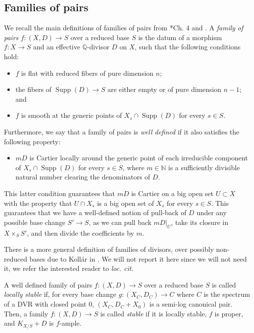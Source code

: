 \documentclass{amsart}
\theoremstyle{definition}
\DeclareMathOperator{\Supp}{Supp}
\newcommand{\rar}{\rightarrow}
\def\K#1.{K_{#1}}
\renewcommand{\qq}{\mathbb{Q}}
\newcommand{\nn}{\mathbb{N}}
\begin{document}
\subsection{Families of pairs} 
We recall the main definitions of families of pairs from \cite{kol_new}*{Ch. 4} and \cite{kol19s}. A \emph{family of pairs} $f \colon (X,D) \rar S$ over a reduced base $S$ is the datum of a morphism $f \colon X \rar S$ and an effective $\qq$-divisor $D$ on $X$, such that the following conditions hold:

\begin{itemize}
    \item $f$ is flat with reduced fibers of pure dimension $n$;
    \item the fibers of $\Supp(D) \rar S$ are either empty or of pure dimension $n-1$; and
    \item $f$ is smooth at the generic points of $X_s \cap \Supp(D)$ for every $s \in S$.
\end{itemize}

Furthermore, we say that a family of pairs is \emph{well defined} if it also satisfies the following property:

\begin{itemize}
    \item $mD$ is Cartier locally around the generic point of each irreducible component of $X_s \cap \Supp(D)$ for every $s \in S$, where $m \in \nn$ is a sufficiently divisible natural number clearing the denominators of $D$.
\end{itemize}

This latter condition guarantees that $mD$ is Cartier on a big open set $U \subset X$ with the property that $U \cap X_s$ is a big open set of $X_s$ for every $s \in S$.
This guarantees that we have a well-defined notion of pull-back of $D$ under any possible base change $S' \rar S$, as we can pull back $mD|_U$, take its closure in $X \times_S S'$, and then divide the coefficients by $m$.

There is a more general definition of families of divisors, over possibly non-reduced bases due to Koll\'ar in \cite{kol19s}. We will not report it here since we will not need it, we refer the interested reader to \emph{loc. cit.}

A well defined family of pairs $f \colon (X,D) \rar S$ over a reduced base $S$ is called \emph{locally stable} if, for every base change $g \colon (X_C,D_C) \rar C$ where $C$ is the spectrum of a DVR with closed point $0$, $(X_C,D_C+X_0)$ is a semi-log canonical pair. 
Then, a family $f \colon (X,D) \rar S$ is called \emph{stable} if it is locally stable, $f$ is proper, and $\K X/S. + D$ is $f$-ample.
\end{document}

